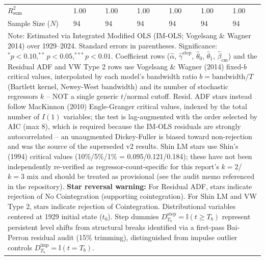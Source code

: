 \begin{table}[H]
\begin{tabular}{p{3.8cm}p{1.35cm}p{1.35cm}p{1.35cm}p{1.35cm}p{1.35cm}p{1.35cm}}
\midrule
$R^2_{\text{sum}}$ & 1.00 & 1.00 & 1.00 & 1.00 & 1.00 & 1.00  \\
Sample Size ($N$) & 94 & 94 & 94 & 94 & 94 & 94  \\
\bottomrule
\multicolumn{7}{p{13.2cm}}{\footnotesize Note: Estimated via Integrated Modified OLS (IM-OLS; Vogelsang \& Wagner 2014) over 1929--2024. Standard errors in parentheses. Significance: $^*p<0.10, ^{**}p<0.05, ^{***}p<0.01$. Coefficient rows ($\hat{\alpha}$, $\hat{\gamma}^{\text{step}}$, $\hat{\theta}_0$, $\hat{\theta}_1$, $\hat{\beta}_{\text{cm}}$) and the Residual ADF and VW Type 2 rows use Vogelsang \& Wagner (2014) fixed-$b$ critical values, interpolated by each model's bandwidth ratio $b=\text{bandwidth}/T$ (Bartlett kernel, Newey-West bandwidth) and its number of stochastic regressors $k$ -- NOT a single generic $t$/normal cutoff. Resid. ADF stars instead follow MacKinnon (2010) Engle-Granger critical values, indexed by the total number of $I(1)$ variables; the test is lag-augmented with the order selected by AIC (max 8), which is required because the IM-OLS residuals are strongly autocorrelated -- an unaugmented Dickey-Fuller is biased toward non-rejection and was the source of the superseded v2 results. Shin LM stars use Shin's (1994) critical values (10\%/5\%/1\% = 0.095/0.121/0.184); these have not been independently re-verified as regressor-count-specific for this report's $k=2$/$k=3$ mix and should be treated as provisional (see the audit memo referenced in the repository). \textbf{Star reversal warning:} For Residual ADF, stars indicate rejection of No Cointegration (supporting cointegration). For Shin LM and VW Type 2, stars indicate rejection of Cointegration. Distributional variables centered at 1929 initial state ($t_0$). Step dummies $D^{\text{step}}_{T_b} = \mathbb{I}(t \ge T_b)$ represent persistent level shifts from structural breaks identified via a first-pass Bai-Perron residual audit (15\% trimming), distinguished from impulse outlier controls $D^{\text{imp}}_{T_b} = \mathbb{I}(t = T_b)$.}
\end{tabular}
\end{table}
